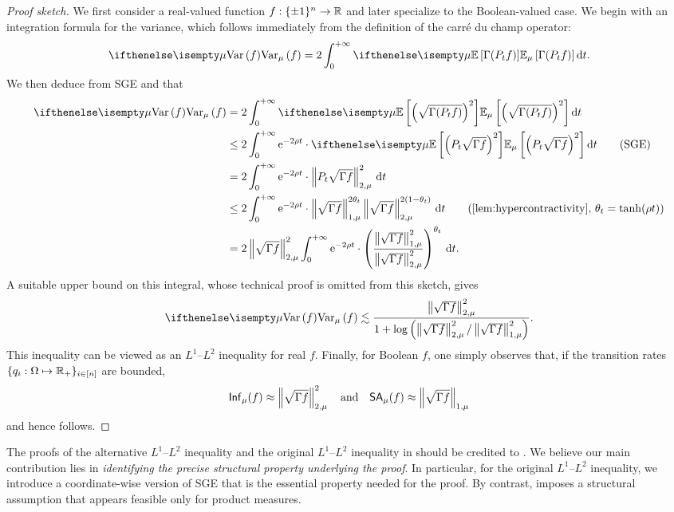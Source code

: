 \begin{proof}[Proof sketch]
    We first consider a real-valued function $f: \{\pm 1\}^n \to \mathbb{R}$ and later specialize to the Boolean-valued case.
    We begin with an integration formula for the variance, which follows immediately from the definition of the carr\'e du champ operator:
    \begin{align*}
        \Var[\mu]{f} = 2 \int_0^{+\infty} \E[\mu]{\Gamma(P_t f)} \dif t.
    \end{align*}
    We then deduce from SGE and  that
    \begin{align*}
        \Var[\mu]{f} 
        &= 2 \int_0^{+\infty} \E[\mu]{\left( \sqrt{\Gamma(P_t f)} \right)^2} \dif t \\
        &\le 2 \int_0^{+\infty} \e^{-2 \rho t} \cdot \E[\mu]{\tp{P_t \sqrt{\Gamma f}}^2} \dif t \tag{SGE} \\
        &= 2 \int_0^{+\infty} \e^{-2 \rho t} \cdot \norm{P_t \sqrt{\Gamma f}}_{2,\mu}^2 \dif t \\ 
        &\le 2 \int_0^{+\infty} \e^{-2 \rho t} \cdot \norm{\sqrt{\Gamma f}}_{1,\mu}^{2 \theta_t} \norm{\sqrt{\Gamma f}}_{2,\mu}^{2 (1-\theta_t)} \dif t \tag{\Cref{lem:hypercontractivity}, $\theta_t = \tanh (\rho t)$} \\
        &= 2 \norm{\sqrt{\Gamma f}}_{2,\mu}^{2} \int_0^{+\infty} \e^{-2 \rho t} \cdot \tp{\frac{\norm{\sqrt{\Gamma f}}_{1,\mu}^2}{\norm{\sqrt{\Gamma f}}_{2,\mu}^2}}^{\theta_t} \dif t.
    \end{align*}
    A suitable upper bound on this integral, whose technical proof is omitted from this sketch, gives
    \begin{align*}
        \Var[\mu]{f} \lesssim \frac{\norm{\sqrt{\Gamma f}}_{2,\mu}^2}{1+\log \tp{ \norm{\sqrt{\Gamma f}}_{2,\mu}^2 / \norm{\sqrt{\Gamma f}}_{1,\mu}^2 }}.
    \end{align*}
    This inequality can be viewed as an $L^1$--$L^2$ inequality for real $f$. Finally, for Boolean $f$, one simply observes that, if the transition rates $\{q_i: \Omega \mapsto \mathbb{R}_+\}_{i\in[n]}$ are bounded, 
    \begin{align*}
        \mathsf{Inf}_\mu(f) \approx \left\lVert \sqrt{\Gamma f} \right\rVert_{2,\mu}^2
        \quad \text{and} \quad
        \mathsf{SA}_\mu(f) \approx \left\lVert \sqrt{\Gamma f} \right\rVert_{1,\mu}
    \end{align*}
    and hence  follows.
\end{proof}

The proofs of the alternative $L^1$--$L^2$ inequality  and the original $L^1$--$L^2$ inequality in  should be credited to \cite{CorderoErausquinLedoux12}. We believe our main contribution lies in \emph{identifying the precise structural property underlying the proof}. In particular, for the original $L^1$--$L^2$ inequality, we introduce a coordinate-wise version of SGE that is the essential property needed for the proof.
By contrast, \cite{CorderoErausquinLedoux12} imposes a structural assumption that appears feasible only for product measures.

